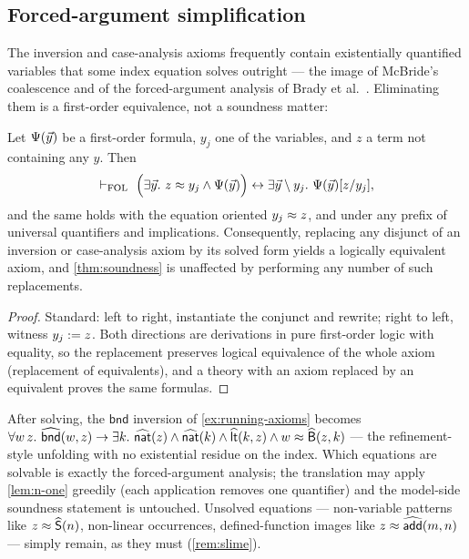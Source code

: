 \subsection{Forced-argument simplification}
\label{sec:translation-none}

The inversion and case-analysis axioms frequently contain existentially
quantified variables that some index equation solves outright --- the
image of McBride's coalescence \cite{McBride1999} and of the
forced-argument analysis of Brady et al.\
\cite{BradyEtAl2004,SozeauMangin2019}.  Eliminating them is a
first-order equivalence, not a soundness matter:

\begin{lemma}
\label{lem:n-one}
Let $\Psi(\vec{y})$ be a first-order formula, $y_j$ one of the
variables, and $z$ a term not containing any $y$.  Then
\[
  \vdash_{\mathrm{FOL}}\ \Bigl(\exists \vec{y}.\ z \approx y_j \wedge \Psi(\vec{y})
  \Bigr) \leftrightarrow \exists \vec{y} \setminus y_j.\
  \Psi(\vec{y})[z/y_j],
\]
and the same holds with the equation oriented $y_j \approx z$, and under
any prefix of universal quantifiers and implications.  Consequently,
replacing any disjunct of an inversion or case-analysis axiom by its
solved form yields a logically equivalent axiom, and \cref{thm:soundness}
is unaffected by performing any number of such replacements.
\end{lemma}

\begin{proof}
Standard: left to right, instantiate the conjunct and rewrite; right to
left, witness $y_j \mathrel{:=} z$.  Both directions are derivations in pure
first-order logic with equality, so the replacement preserves logical
equivalence of the whole axiom (replacement of equivalents), and a
theory with an axiom replaced by an equivalent proves the same formulas.
\end{proof}

\begin{remark}
After solving, the $\mathsf{bnd}$ inversion of \cref{ex:running-axioms}
becomes $\forall w\,z.\ \widehat{\mathsf{bnd}}(w,z) \to \exists k.\
\widehat{\mathsf{nat}}(z) \wedge \widehat{\mathsf{nat}}(k) \wedge \widehat{\mathsf{lt}}(k,z)
\wedge w \approx \widehat{\mathsf{B}}(z,k)$ --- the refinement-style unfolding
with no existential residue on the index.  Which equations are solvable
is exactly the forced-argument analysis; the translation may apply
\cref{lem:n-one} greedily (each application removes one quantifier) and
the model-side soundness statement is untouched.  Unsolved equations ---
non-variable patterns like $z \approx \widehat{\mathsf{S}}(n)$, non-linear
occurrences, defined-function images like $z \approx
\widehat{\mathsf{add}}(m,n)$ --- simply remain, as they must
(\cref{rem:slime}).
\end{remark}

